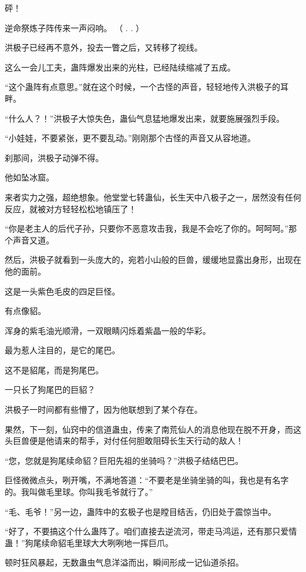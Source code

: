 
\begin{this_body}

砰！

逆命祭炼子阵传来一声闷响。 （  .    .   ）

洪极子已经再不意外，投去一瞥之后，又转移了视线。

这么一会儿工夫，蛊阵爆发出来的光柱，已经陆续缩减了五成。

“这个蛊阵有点意思。”就在这个时候，一个古怪的声音，轻轻地传入洪极子的耳畔。

“什么人？！”洪极子大惊失色，蛊仙气息猛地爆发出来，就要施展强烈手段。

“小娃娃，不要紧张，更不要乱动。”刚刚那个古怪的声音又从容地道。

刹那间，洪极子动弹不得。

他如坠冰窟。

来者实力之强，超绝想象。他堂堂七转蛊仙，长生天中八极子之一，居然没有任何反应，就被对方轻轻松松地镇压了！

“你是老主人的后代子孙，只要你不恶意攻击我，我是不会吃了你的。呵呵呵。”那个声音又道。

然后，洪极子就看到一头庞大的，宛若小山般的巨兽，缓缓地显露出身形，出现在他的面前。

这是一头紫色毛皮的四足巨怪。

有点像貂。

浑身的紫毛油光顺滑，一双眼睛闪烁着紫晶一般的华彩。

最为惹人注目的，是它的尾巴。

这不是貂尾，而是狗尾巴。

一只长了狗尾巴的巨貂？

洪极子一时间都有些懵了，因为他联想到了某个存在。

果然，下一刻，仙窍中的信道蛊虫，传来了南荒仙人的消息他现在脱不开身，而这头巨兽便是他请来的帮手，对付任何胆敢阻碍长生天行动的敌人！

“您，您就是狗尾续命貂？巨阳先祖的坐骑吗？”洪极子结结巴巴。

巨怪微微点头，咧开嘴，不满地答道：“不要老是坐骑坐骑的叫，我也是有名字的。我叫做毛里球。你叫我毛爷就行了。”

“毛、毛爷！”另一边，蛊阵中的玄极子也是瞠目结舌，仍旧处于震惊当中。

“好了，不要搞这个什么蛊阵了。咱们直接去逆流河，带走马鸿运，还有那只爱情蛊！”狗尾续命貂毛里球大大咧咧地一挥巨爪。

顿时狂风暴起，无数蛊虫气息洋溢而出，瞬间形成一记仙道杀招。


\end{this_body}
